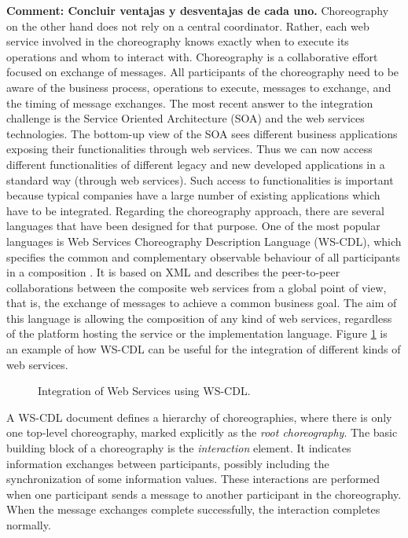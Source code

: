 {\bf Comment: Concluir ventajas y desventajas de cada uno.} 
Choreography on the other hand does not rely on a central coordinator. Rather, each
web service involved in the choreography knows exactly when to execute its operations
and whom to interact with. Choreography is a collaborative effort focused on exchange
of messages. All participants of the choreography need to be aware of the business
process, operations to execute, messages to exchange, and the timing of message
exchanges.
The most recent answer to the integration challenge is the Service Oriented
Architecture (SOA) and the web services technologies. The bottom-up view of the SOA
sees different business applications exposing their functionalities through web services.
Thus we can now access different functionalities of different legacy and new developed
applications in a standard way (through web services). Such access to functionalities is
important because typical companies have a large number of existing applications
which have to be integrated.
Regarding the choreography approach, there are several languages that 
have been designed for that purpose. One of the most popular languages 
is Web Services Choreography Description Language (WS-CDL), 
which specifies the common and complementary observable behaviour of 
all participants in a composition \cite{W3C2005}. 
It is based on XML and describes the peer-to-peer collaborations 
between the composite web services from a global point of view, that is, 
the exchange of messages to achieve a common business goal. 
The aim of this language is allowing the composition of any kind of web services, 
regardless of the platform hosting the service or the implementation language. 
Figure \ref{Figure2} is an example of how WS-CDL can be useful 
for the integration of different kinds of web services.

\begin{figure}[h]
\begin{center}
\end{center}
\caption{Integration of Web Services using WS-CDL.}
\label{Figure2}
\end{figure}

A WS-CDL document defines a hierarchy of choreographies, where there is only one top-level choreography, marked explicitly as the \textit{root choreography}. The basic building block of a choreography is the \textit{interaction} element. It indicates information exchanges between participants, possibly including the synchronization of some information values. These interactions are performed when one participant sends a message to another participant in the choreography. When the message exchanges complete successfully, the interaction completes normally. 

